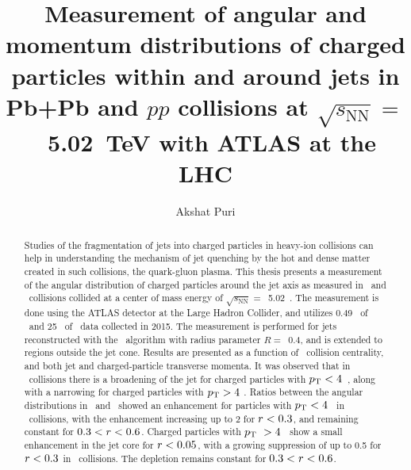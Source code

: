 \documentclass[fullpage, UKenglish]{uiucthesis2009}
\begin{document}
\title{Measurement of angular and momentum distributions of charged particles within and around jets in P\MakeLowercase{b}+P\MakeLowercase{b} and \MakeLowercase{$pp$} collisions at $\sqrt{s_{\mathrm{NN}}}=$~5.02~T\MakeLowercase{e}V with ATLAS at the LHC}
\author{Akshat Puri}
\phdthesis
{}
\maketitle

\frontmatter

\setcounter{page}{2}
\begin{abstract}

Studies of the fragmentation of jets into charged particles in heavy-ion collisions can help in understanding the mechanism of jet quenching by the hot and dense matter created in such collisions, the quark-gluon plasma. This thesis presents a measurement of the angular distribution of charged particles around the jet axis as measured in \pbpb\ and \pp\ collisions collided at a center of mass energy of $\sqrt{s_{\mathrm{NN}}}=$~5.02~\TeV. The measurement is done using the ATLAS detector at the Large Hadron Collider, and utilizes 0.49 \pb\ of \pbpb\ and 25 \pb\ of \pp\ data collected in 2015. The measurement is performed for jets reconstructed with the \antikt\ algorithm with radius parameter $R = $~0.4, and is extended to regions outside the jet cone. Results are presented as a function of \pbpb\ collision centrality, and both jet and charged-particle transverse momenta. It was observed that in \pbpb\ collisions there is a broadening of the jet for charged particles with \mbox{$\mbox{$p_{\mathrm{T}}$} < 4$ \GeV}, along with a narrowing for  charged particles with $\mbox{$p_{\mathrm{T}}$} > 4$ \GeV. Ratios between the angular distributions in \pbpb\ and \pp\ showed an enhancement for particles with $\mbox{$p_{\mathrm{T}}$} < 4$ \GeV\ in \pbpb\ collisions, with the enhancement increasing up to 2 for \mbox{$\mbox{$r$} < 0.3$}, and remaining constant for \mbox{$0.3 < \mbox{$r$} < 0.6$}. Charged particles with $\mbox{$p_{\mathrm{T}}$}\ > 4$ \GeV\ show a small enhancement in the jet core for $\mbox{$r$} < 0.05$, with a growing suppression of up to 0.5 for \mbox{$\mbox{$r$} < 0.3$} in \pbpb\ collisions. The depletion remains constant for \mbox{$0.3 < \mbox{$r$} < 0.6$}.
\end{abstract}
\end{document}
